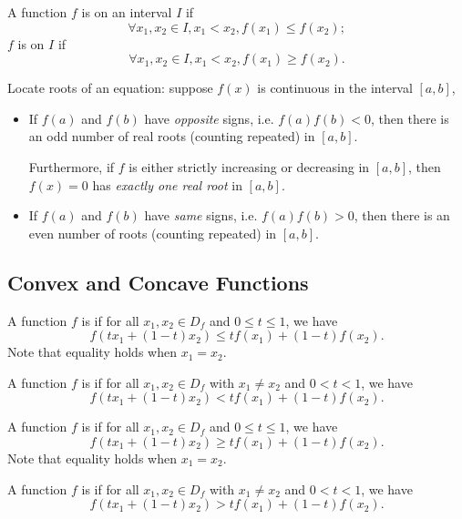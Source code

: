 \begin{definition}
A function $f$ is  on an interval $I$ if 
\[\forall x_1,x_2\in I, x_1<x_2, f(x_1)\le f(x_2);\]
$f$ is  on $I$ if
\[\forall x_1,x_2\in I, x_1<x_2, f(x_1)\ge f(x_2).\]
\end{definition}

Locate roots of an equation: suppose $f(x)$ is continuous in the interval $[a,b]$,
\begin{itemize}
\item If $f(a)$ and $f(b)$ have \emph{opposite} signs, i.e. $f(a)f(b)<0$, then there is an odd number of real roots (counting repeated) in $[a,b]$.

Furthermore, if $f$ is either strictly increasing or decreasing in $[a,b]$, then $f(x)=0$ has \emph{exactly one real root} in $[a,b]$.

\item If $f(a)$ and $f(b)$ have \emph{same} signs, i.e. $f(a)f(b)>0$, then there is an even number of roots (counting repeated) in $[a,b]$.
\end{itemize}

\subsection{Convex and Concave Functions}
\begin{definition}
A function $f$ is  if for all $x_1,x_2\in D_f$ and $0\le t\le 1$, we have
\[ f(tx_1+(1-t)x_2)\le tf(x_1)+(1-t)f(x_2). \]
Note that equality holds when $x_1=x_2$.
\end{definition}

\begin{definition}
A function $f$ is  if for all $x_1,x_2\in D_f$ with $x_1\neq x_2$ and $0<t<1$, we have
\[ f(tx_1+(1-t)x_2)<tf(x_1)+(1-t)f(x_2). \]
\end{definition}

\begin{definition}
A function $f$ is  if for all $x_1,x_2\in D_f$ and $0\le t\le 1$, we have
\[ f(tx_1+(1-t)x_2)\ge tf(x_1)+(1-t)f(x_2). \]
Note that equality holds when $x_1=x_2$.
\end{definition}

\begin{definition}
A function $f$ is  if for all $x_1,x_2\in D_f$ with $x_1\neq x_2$ and $0<t<1$, we have
\[ f(tx_1+(1-t)x_2)>tf(x_1)+(1-t)f(x_2). \]
\end{definition}

